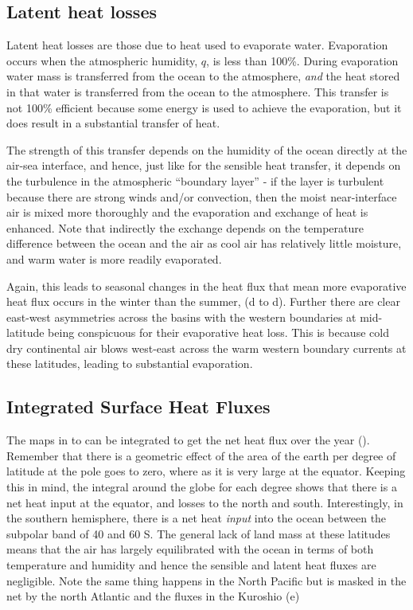 \subsection{Latent heat losses}

Latent heat losses are those due to heat used to evaporate water.  Evaporation occurs when the atmospheric humidity, $q$, is less than 100\%.  During evaporation water mass is transferred from the ocean to the atmosphere, \emph{and} the heat stored in that water is transferred from the ocean to the atmosphere.   This transfer is not 100\% efficient because some energy is used to achieve the evaporation, but it does result in a substantial transfer of heat.  

The strength of this transfer depends on the humidity of the ocean directly at the air-sea interface, and hence, just like for the sensible heat transfer, it depends on the turbulence in the atmospheric ``boundary layer'' - if the layer is turbulent because there are strong winds and/or convection, then the moist near-interface air is mixed more thoroughly and the evaporation and exchange of heat is enhanced.   Note that indirectly the exchange depends on the temperature difference between the ocean and the air as cool air has relatively little moisture, and warm water is more readily evaporated.  

Again, this leads to seasonal changes in the heat flux that mean more evaporative heat flux occurs in the winter than the summer, (d to d).  Further there are clear east-west asymmetries across the basins with the western boundaries at mid-latitude being conspicuous for their evaporative heat loss.  This is because cold dry continental air blows west-east across the warm western boundary currents at these latitudes, leading to substantial evaporation.  

\subsection{Integrated Surface Heat Fluxes}

The maps in  to  can be integrated to get the net heat flux over the year ().  Remember that there is a geometric effect of the area of the earth per degree of latitude at the pole goes to zero, where as it is very large at the equator.  Keeping this in mind, the integral around the globe for each degree shows that there is a net heat input at the equator, and losses to the north and south.  Interestingly, in the southern hemisphere, there is a net heat \emph{input} into the ocean between the subpolar band of 40 and 60 S.   The general lack of land mass at these latitudes means that the air has largely equilibrated with the ocean in terms of both temperature and humidity and hence the sensible and latent heat fluxes are negligible.  Note the same thing happens in the North Pacific but is masked in the net by the north Atlantic and the fluxes in the Kuroshio (e)

